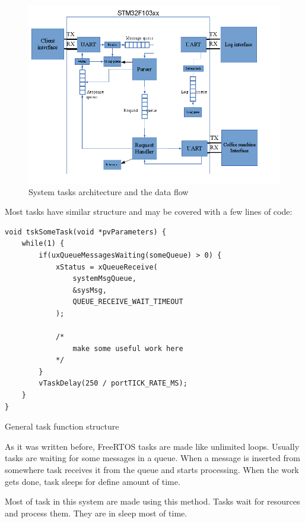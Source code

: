\begin{center}
 \begin{figure}[h]
	\includegraphics[width=\textwidth]{../images/implementation/embedded_server/system_tasks_and_data_flow.png}
	\caption{System tasks architecture and  the data flow}
	\label{fig:server_components_and_data_flow}
 \end{figure}
\end{center}

Most tasks have similar structure and may be covered with a few lines of code:


\begin{listing}[H]
\begin{verbatim}
void tskSomeTask(void *pvParameters) {
	while(1) {
		if(uxQueueMessagesWaiting(someQueue) > 0) {
			xStatus = xQueueReceive( 
				systemMsgQueue, 
				&sysMsg, 
				QUEUE_RECEIVE_WAIT_TIMEOUT 
			);
			
			/* 
				make some useful work here
			*/
		}
		vTaskDelay(250 / portTICK_RATE_MS);
	}
}
\end{verbatim}
\caption{General task function structure}
\label{lst:task_function_structure}
\end{listing}

As it was written before, FreeRTOS tasks are made like unlimited loops.
Usually tasks are waiting for some messages in a queue.
When a message is inserted from somewhere task receives it from the queue and
starts processing. When the work gets done,  task sleeps for define amount of
time. 

Most of task in this system are made using this method. 
Tasks wait for resources and process them. 
They are in sleep most of time.

